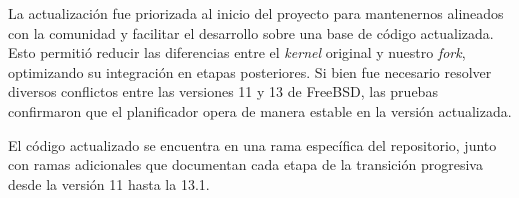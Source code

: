 La actualización fue priorizada al inicio del proyecto para mantenernos alineados con la comunidad y facilitar el desarrollo sobre una base de código actualizada. Esto permitió reducir las diferencias entre el \textit{kernel} original y nuestro \textit{fork}, optimizando su integración en etapas posteriores. Si bien fue necesario resolver diversos conflictos entre las versiones 11 y 13 de FreeBSD, las pruebas confirmaron que el planificador opera de manera estable en la versión actualizada.\par

El código actualizado se encuentra en una rama específica del repositorio, junto con ramas adicionales que documentan cada etapa de la transición progresiva desde la versión 11 hasta la 13.1.\par





